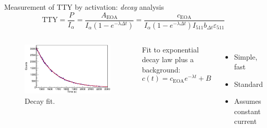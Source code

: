 \documentclass[11pt]{beamer}
\begin{document}
\begin{frame}{Measurement of TTY by activation: \textit{decay} analysis}
	\begin{equation}
		\text{TTY} = \frac{P}{I_\alpha} = \frac{A_\text{EOA}}{I_\alpha \left( 1-e^{-\lambda \Delta t}  \right)} = 
		\frac{c_\text{EOA}}{I_\alpha \left( 1-e^{-\lambda \Delta t}  \right) I_{511} b_{\Delta t} \varepsilon_{511}  }
	\end{equation}
	\begin{columns}
	\begin{figure}[H]
		\centering
		\includegraphics[width=\textwidth]{example_decay_fit.eps}
		\caption{Decay fit.}
		\label{decay_fit}
	\end{figure}
	Fit to exponential decay law plus a background:
	\begin{equation}
		c(t) = c_\text{EOA} e^{-\lambda t} + B
	\end{equation}
	\begin{itemize}
		\item Simple, fast
		\item Standard
		\item Assumes constant current
	\end{itemize}
	\end{columns}
\end{frame}
\end{document}
